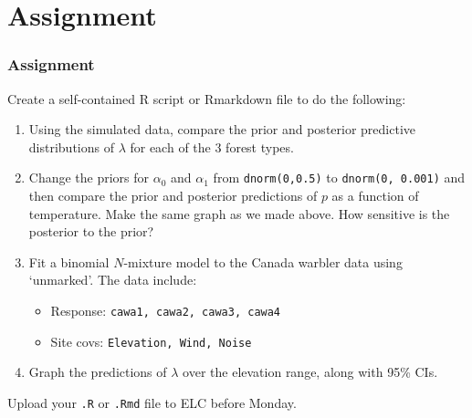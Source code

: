 \documentclass[color=usenames,dvipsnames]{beamer}\usepackage[]{graphicx}\usepackage[]{color}
\newcommand{\inr}[1]{\colorbox{inlinecolor}{\texttt{#1}}}
\begin{document}
\section{Assignment}




\begin{frame}[fragile]
  \frametitle{Assignment}
  \footnotesize
  Create a self-contained R script or Rmarkdown file
  to do the following:
  \vfill
  \begin{enumerate}
    \footnotesize
    \item Using the simulated data, compare the prior and posterior
      predictive distributions of $\lambda$ for each of the 3 forest
      types. 
    \item Change the priors for $\alpha_0$ and $\alpha_1$ from
      \inr{dnorm(0,0.5)} to \inr{dnorm(0, 0.001)} and then compare the
      prior and posterior predictions of $p$ as a function of
      temperature. Make the same graph as we made above. How
      sensitive is the posterior to the prior?
    \item Fit a binomial $N$-mixture model to the Canada warbler data
      using `unmarked'. The data include: 
      \begin{itemize}
        \footnotesize
        \item Response: \texttt{cawa1, cawa2, cawa3, cawa4}
        \item Site covs: \texttt{Elevation, Wind, Noise}
      \end{itemize}
    \item Graph the predictions of $\lambda$ over the 
      elevation range, along with 95\% CIs.
  \end{enumerate}
  \vfill
  Upload your {\tt .R} or {\tt .Rmd} file to ELC before Monday. 
\end{frame}
\end{document}
